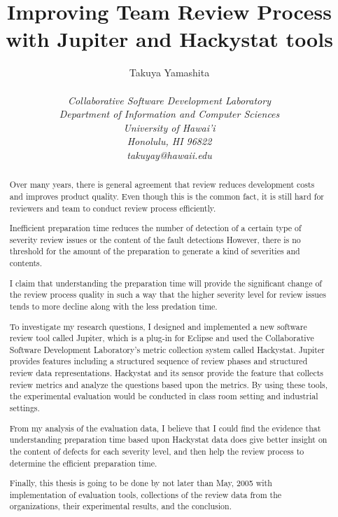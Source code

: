 \documentclass[11pt,twocolumn]{article}
\begin{document}
\title{Improving Team Review Process \\ with Jupiter and Hackystat tools}

\author{\protect\begin{tabular}{ccc}
Takuya Yamashita  \\
\end{tabular}\\
\em  Collaborative Software Development Laboratory \\
\em  Department of Information and Computer Sciences \\
\em  University of Hawai'i \\
\em  Honolulu, HI 96822 \\
\em  takuyay@hawaii.edu} \maketitle \thispagestyle{empty}

\begin{abstract}  %

Over many years, there is general agreement that review reduces
development costs and improves product quality. Even though this is
the common fact, it is still hard for reviewers and team to conduct
review process efficiently.

Inefficient preparation time reduces the number of detection of a
certain type of severity review issues or the content of the fault
detections However, there is no threshold for the amount of the
preparation to generate a kind of severities and contents.

I claim that understanding the preparation time will provide the
significant change of the review process quality in such a way that
the higher severity level for review issues  tends to more decline
along with the less predation time.

To investigate my research questions, I designed and implemented a
new software review tool called Jupiter, which is a plug-in for
Eclipse and used the Collaborative Software Development Laboratory's
metric collection system called Hackystat. Jupiter provides features
including a structured sequence of review phases and structured
review data representations. Hackystat and its sensor provide the
feature that collects review metrics and analyze the questions based
upon the metrics. By using these tools, the experimental evaluation
would be conducted in class room setting and industrial settings.

From my analysis of the evaluation data, I believe that I could find
the evidence that understanding preparation time based upon
Hackystat data does give better insight on the content of defects
for each severity level, and then help the review process to
determine the efficient preparation time.

Finally, this thesis is going to be done by not later than May, 2005
with implementation of evaluation tools, collections of the review
data from the organizations, their experimental results, and the
conclusion.

\end{abstract}
\end{document}
